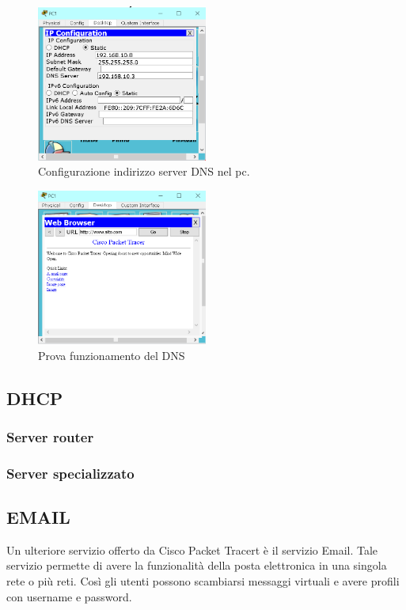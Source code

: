 \begin{figure}[h]
    \centering
    \includegraphics[width=0.5\textwidth]{images/06.01.02.png}
    \caption{Configurazione indirizzo server DNS nel pc.}
    \label{fig:dns-conf-pc}
\end{figure}

\begin{figure}[h]
    \centering
    \includegraphics[width=0.5\textwidth]{images/06.01.03.png}
    \caption{Prova funzionamento del DNS}
    \label{fig:dns-test}
\end{figure}

\subsection{DHCP}
\subsubsection{Server router}
\subsubsection{Server specializzato}
\subsection{EMAIL}
Un ulteriore servizio offerto da Cisco Packet Tracert è il servizio Email. Tale servizio permette di avere la funzionalità della posta elettronica in una singola rete o più reti. Così gli utenti possono scambiarsi messaggi virtuali e avere profili con username e password.


